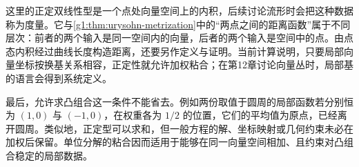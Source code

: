 这里的正定双线性型是一个点处向量空间上的内积，后续讨论流形时会把这种数据称为度量。它与\cref{g1:thm:urysohn-metrization}中的“两点之间的距离函数”属于不同层次：前者的两个输入是同一空间内的向量，后者的两个输入是空间中的点。由点态内积经过曲线长度构造距离，还要另作定义与证明。当前计算说明，只要局部向量坐标按换基关系相容，正定性就允许加权粘合；在第12章讨论向量丛时，局部基的语言会得到系统定义。

最后，允许求凸组合这一条件不能省去。例如两份取值于圆周的局部函数若分别恒为 \((1,0)\) 与 \((-1,0)\)，在权重各为 \(1/2\) 的位置，它们的平均值为原点，已经离开圆周。类似地，正定型可以求和，但一般方程的解、坐标映射或几何约束未必在加权后保留。单位分解的粘合因而适用于能够在同一向量空间相加、且约束对凸组合稳定的局部数据。
